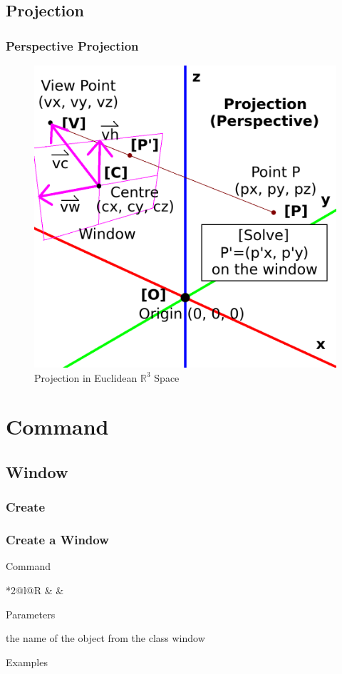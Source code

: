 \documentclass[9pt]{beamer}
\begin{document}
\subsection{Projection}

\begin{frame} \frametitle{Perspective Projection}

	\begin{figure}[t]
		\includegraphics[width=.5\columnwidth]{fig/perspective-projection.png}
		\caption{Projection in Euclidean $\mathbb{R}^3$ Space}
	\end{figure}

\end{frame}


\section{Command}

\subsection{Window}

\subsubsection{Create}

\begin{frame}[t] \frametitle{Create a Window}

	\begin{block}{Command}
		\begin{CmdFmt}{*{2}{@{}l}@{}R}
			 &
			 & \InstrItem
		\end{CmdFmt}
	\end{block}

	\begin{block}{Parameters}
		\begin{itemize}
			 the name of the object from the class window
		\end{itemize}
	\end{block}

	\begin{block}{Examples}
	\end{block}

\end{frame}
\end{document}
